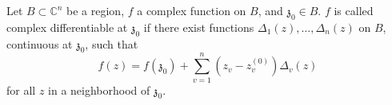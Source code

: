 Let $B \subset \mathbb{C}^n$ be a region, $f$ a complex function on $B$, and $\mathfrak{z}_0 \in B$. $f$ is called complex differentiable at $\mathfrak{z}_0$ if there exist functions $\Delta_1(z), \ldots, \Delta_n(z)$ on $B$, continuous at $\mathfrak{z}_0$, such that
$$f(z) = f(\mathfrak{z}_0) + \sum_{v=1}^{n} (z_v - z_v^{(0)}) \Delta_v(z)$$
for all $z$ in a neighborhood of $\mathfrak{z}_0$.
